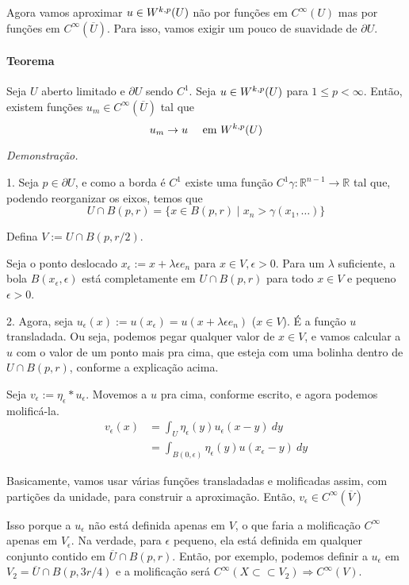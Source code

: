 \documentclass[a4paper, 11pt]{article}
\newcommand{\R}{\mathbb{R}}
\newcommand{\pu}{\partial U}
\newcommand{\e}{\epsilon}
\begin{document}
Agora vamos aproximar \( u \in W^{k,p}(U) \) não por funções em \( C^\infty(U) \) mas por funções em \( C^\infty(\overline{U}) \). Para isso, vamos exigir um pouco de suavidade de \( \pu \).

\paragraph{Teorema} Seja \( U \) aberto limitado e \( \pu \) sendo \( C^1 \). Seja \( u \in W^{k,p}(U) \) para \( 1 \leq p < \infty \). Então, existem funções \( u_m \in C^\infty(\overline{U}) \) tal que \[ u_m \rightarrow u \quad \text{ em }W^{k,p}(U) \]

\textit{Demonstração.} 

1. Seja \( p \in \pu  \), e como a borda é \( C^1 \) existe uma função \( C^1 \gamma:\R^{n-1}\rightarrow \R\) tal que, podendo reorganizar os eixos, temos que \[ U \cap B(p,r) = \{ x \in B(p,r) \mid x_n > \gamma(x_1, \ldots)\} \]

Defina \( V:= U \cap B(p, r/2) \).

Seja o ponto deslocado \( x_\e := x + \lambda\e e_n \) para \( x \in V, \e>0 \). Para um \( \lambda \) suficiente, a bola \( B(x_\e, \e) \) está completamente em \( U \cap B(p,r) \) para todo \( x \in V \) e pequeno \( \e>0 \).


2. Agora, seja \( u_\e(x) := u(x_\e) = u(x + \lambda\e e_n ) \) (\( x \in V \)). É a função \( u \) transladada. Ou seja, podemos pegar qualquer valor de \( x \in V \), e vamos calcular a \( u \) com o valor de um ponto mais pra cima, que esteja com uma bolinha dentro de \( U \cap B(p,r) \), conforme a explicação acima.

Seja \( v_\e :=  \eta_\e * u_\e \). Movemos a \( u \) pra cima, conforme escrito, e agora podemos molificá-la.\begin{align*}
	v_\e(x) &= \int_U \eta_\e(y) u_\e (x-y)\ dy\\
	&= \int_{B(0,\e)} \eta_\e(y) u(x_\e -y)\ dy
\end{align*}

Basicamente, vamos usar várias funções transladadas e molificadas assim, com partições da unidade, para construir a aproximação. Então, \( v_\e \in C^\infty(\overline{V}) \)

Isso porque a $u_\e$ não está definida apenas em $V$, o que faria a molificação $ C^\infty $ apenas em $V_\e$. Na verdade, para $\e$ pequeno, ela está definida em qualquer conjunto contido em $\overline{U} \cap B(p,r)$. Então, por exemplo, podemos definir a $u_\e$ em $V_2  = \overline{U} \cap B(p, 3r/4)$ e a molificação será $C^\infty(X \subset\subset V_2) \Rightarrow C^\infty(V)$.
\end{document}
